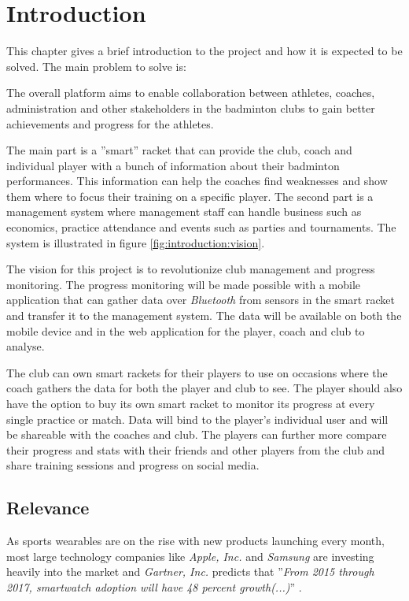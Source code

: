 \chapter{Introduction}
This chapter gives a brief introduction to the project and how it is expected to be solved.
The main problem to solve is:


The overall platform aims to enable collaboration between athletes, coaches, administration and other stakeholders in the badminton clubs to gain better achievements and progress for the athletes.

The main part is a ''smart'' racket that can provide the club, coach and individual player with a bunch of information about their badminton performances.
This information can help the coaches find weaknesses and show them where to focus their training on a specific player.
The second part is a management system where management staff can handle business such as economics, practice attendance and events such as parties and tournaments.
The system is illustrated in figure \ref{fig:introduction:vision}.


The vision for this project is to revolutionize club management and progress monitoring.
The progress monitoring will be made possible with a mobile application that can gather data over \textit{Bluetooth} from sensors in the smart racket and transfer it to the management system.
The data will be available on both the mobile device and in the web application for the player, coach and club to analyse.

The club can own smart rackets for their players to use on occasions where the coach gathers the data for both the player and club to see.
The player should also have the option to buy its own smart racket to monitor its progress at every single practice or match.
Data will bind to the player's individual user and will be shareable with the coaches and club.
The players can further more compare their progress and stats with their friends and other players from the club and share training sessions and progress on social media.

\section*{Relevance}
As sports wearables are on the rise with new products launching every month, most large technology companies like \textit{Apple, Inc.} and \textit{Samsung} are investing heavily into the market and \textit{Gartner, Inc.} predicts that ''\textit{From 2015 through 2017, smartwatch adoption will have 48 percent growth(...)}'' \citep{introduction:relevance:gartner}.

